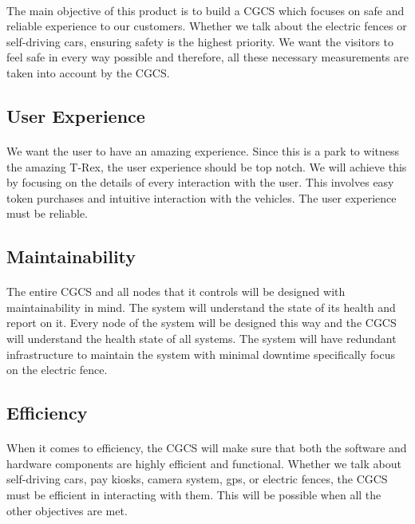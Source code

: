 \documentclass[12pt]{article}
\begin{document}
\paragraph{}The main objective of this product is to build a CGCS which focuses on safe and reliable experience to our customers. Whether we talk about the electric fences or self-driving cars, ensuring safety is the highest priority. We want the visitors to feel safe in every way possible and therefore, all these necessary measurements are taken into account by the CGCS.
\subsection{User Experience}\label{use}
\paragraph{}We want the user to have an amazing experience. Since this is a park to witness the amazing T-Rex, the user experience should be top notch. We will achieve this by focusing on the details of every interaction with the user. This involves easy token purchases and intuitive interaction with the vehicles. The user experience must be reliable. 
\subsection{Maintainability}\label{mai}
\paragraph{}The entire CGCS and all nodes that it controls will be designed with maintainability in mind. The system will understand the state of its health and report on it. Every node of the system will be designed this way and the CGCS will understand the health state of all systems. The system will have redundant infrastructure to maintain the system with minimal downtime specifically focus on the electric fence.
\subsection{Efficiency}\label{eff}
\paragraph{}When it comes to efficiency, the CGCS will make sure that both the software and hardware components are highly efficient and functional. Whether we talk about self-driving cars, pay kiosks, camera system, gps, or electric fences, the CGCS must be efficient in interacting with them. This will be possible when all the other objectives are met.  
\end{document}
